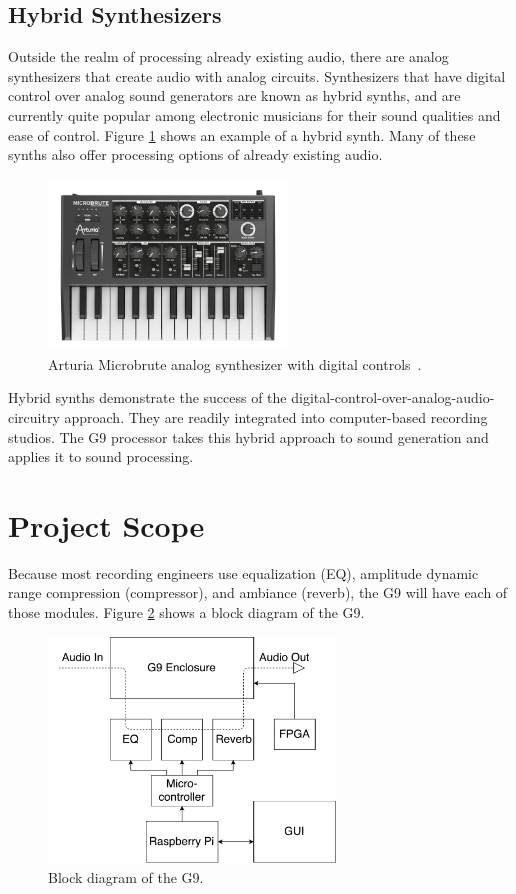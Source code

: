 \documentclass[journal]{IEEEtran}
\begin{document}
	\subsection{Hybrid Synthesizers}
	Outside the realm of processing already existing audio, there are analog synthesizers that create audio with analog circuits. Synthesizers that have digital control over analog sound generators are known as hybrid synths, and are currently quite popular among electronic musicians for their sound qualities and ease of control. Figure \ref{fig:analogSynth} shows an example of a hybrid synth. Many of these synths also offer processing options of already existing audio.
	
	\begin{figure}
		\centering
		\includegraphics[width=2.5in]{analogSynth}
		\caption{Arturia Microbrute analog synthesizer with digital controls~\cite{analogSynth}. }
		\label{fig:analogSynth}
	\end{figure}
	
	Hybrid synths demonstrate the success of the digital-control-over-analog-audio-circuitry approach. They are readily integrated into computer-based recording studios. The G9 processor takes this hybrid approach to sound generation and applies it to sound processing.
	
	
	
	\section{Project Scope}
	
	Because most recording engineers use equalization (EQ), amplitude dynamic range compression (compressor), and ambiance (reverb), the G9 will have each of those modules. Figure \ref{fig:blockDiagram} shows a block diagram of the G9.
	
	\begin{figure}
		\centering
		\includegraphics[width=3in]{blockDiagram}
		\caption{Block diagram of the G9. }
		\label{fig:blockDiagram}
	\end{figure}
	
\end{document}
